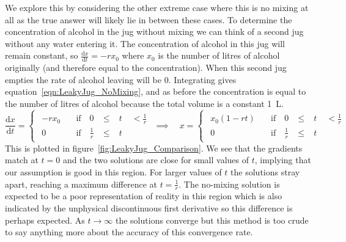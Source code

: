 \begin{parts}
\begin{solution}
		We explore this by considering the other extreme case where this is no mixing at all as the true answer will likely lie in between these cases. To determine the concentration of alcohol in the jug without mixing we can think of a second jug without any water entering it. The concentration of alcohol in this jug will remain constant, so $\frac{\mathrm{d}x}{\mathrm{d}t} = -rx_0$ where $x_0$ is the number of litres of alcohol originally (and therefore equal to the concentration). When this second jug empties the rate of alcohol leaving will be 0. Integrating gives equation~\eqref{eqn:LeakyJug_NoMixing}, and as before the concentration is equal to the number of litres of alcohol because the total volume is a constant 1~L.
		\begin{equation}
			\frac{\mathrm{d}x}{\mathrm{d}t} =
			\begin{cases}
				\begin{alignedat}{3}
					-rx_0 &\quad \text{if} \quad 0\; &\leq\; &t \; &< \frac{1}{r} \\
					0\phantom{x} &\quad \text{if} \quad \frac{1}{r}\; &\leq\; &t &
				\end{alignedat}
			\end{cases} \implies \quad x = \begin{cases}
			\begin{alignedat}{3}
				x_0(1 - rt) &\quad \text{if} \quad 0\; &\leq\; &t \;&< \frac{1}{r} \\
				0\phantom{-rt}     &\quad \text{if} \quad \frac{1}{r}\; &\leq\; &t &
			\end{alignedat}
			\end{cases}
			\label{eqn:LeakyJug_NoMixing}
		\end{equation}
		This is plotted in figure~\ref{fig:LeakyJug_Comparison}. We see that the gradients match at $t = 0$ and the two solutions are close for small values of $t$, implying that our assumption is good in this region. For larger values of $t$ the solutions stray apart, reaching a maximum difference at $t = \frac{1}{r}$. The no-mixing solution is expected to be a poor representation of reality in this region which is also indicated by the unphysical discontinuous first derivative so this difference is perhaps expected. As $t \to \infty$ the solutions converge but this method is too crude to say anything more about the accuracy of this convergence rate.
		

\end{solution}
\end{parts}
